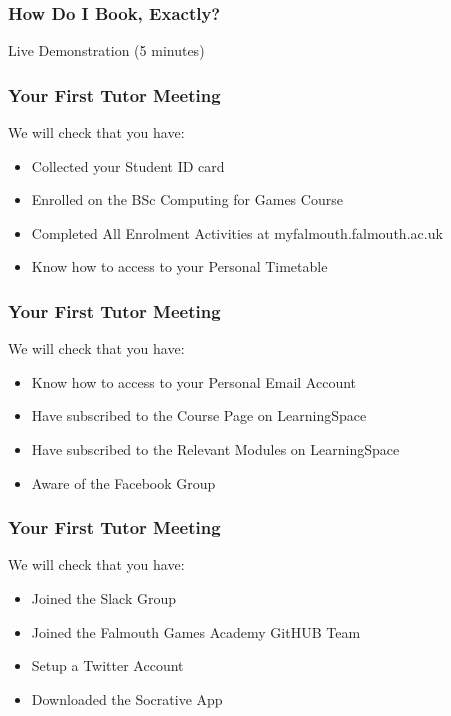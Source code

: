 \begin{frame}
	\frametitle{How Do I Book, Exactly?}	
	\begin{center}
		Live Demonstration (5 minutes)
	\end{center}
\end{frame}

\begin{frame}
	\frametitle{Your First Tutor Meeting}	
	
	We will check that you have:
	
	\begin{itemize}
	\item Collected your Student ID card
	\item Enrolled on the BSc Computing for Games Course
	\item Completed All Enrolment Activities at myfalmouth.falmouth.ac.uk
	\item Know how to access to your Personal Timetable
	\end{itemize}
\end{frame}

\begin{frame}
	\frametitle{Your First Tutor Meeting}	
	
	We will check that you have:
	
	\begin{itemize}
	\item Know how to access to your Personal Email Account
	\item Have subscribed to the Course Page on LearningSpace
	\item Have subscribed to the Relevant Modules on LearningSpace
	\item Aware of the Facebook Group
	\end{itemize}
\end{frame}

\begin{frame}
	\frametitle{Your First Tutor Meeting}	
	
	We will check that you have:
	
	\begin{itemize}
	\item Joined the Slack Group
	\item Joined the Falmouth Games Academy GitHUB Team
	\item Setup a Twitter Account
	\item Downloaded the Socrative App
	\end{itemize}
\end{frame}

